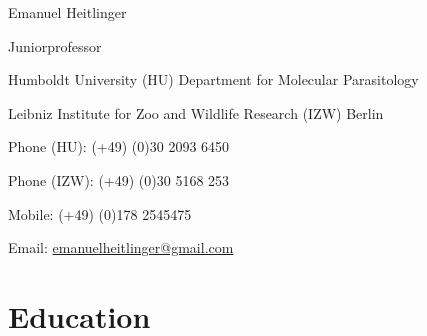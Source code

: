 \documentclass[10pt,a4paper]{article}
\def\name{Emanuel Heitlinger}
\renewenvironment{itemize}{
  \begin{list}{}{
    \setlength{\leftmargin}{2.5em}
    \setlength{\itemsep}{0.25em}
    \setlength{\parskip}{0pt}
    \setlength{\parsep}{0.25em}
  }
}{
  \end{list}
}
\begin{document}
{\huge \name}


\bigskip

\begin{minipage}[t]{0.4\textwidth}
  Juniorprofessor
  \begin{itemize}
  \item Humboldt University (HU)
    Department for Molecular Parasitology 
  \item Leibniz Institute for Zoo and
    Wildlife Research (IZW)
    Berlin
  \end{itemize}
\end{minipage}
\hspace{1cm}
\begin{minipage}[t]{0.5\textwidth}
  \bigskip
  \begin{itemize}
  \item Phone (HU): (+49) (0)30 2093 6450 
  \item Phone (IZW): (+49) (0)30 5168 253 
  \item Mobile: (+49) (0)178 2545475
  \item Email: \href{mailto:emanuelheitlinger@gmail.com}{emanuelheitlinger@gmail.com}
\end{itemize}
\end{minipage}

\section*{Education}
\end{document}
